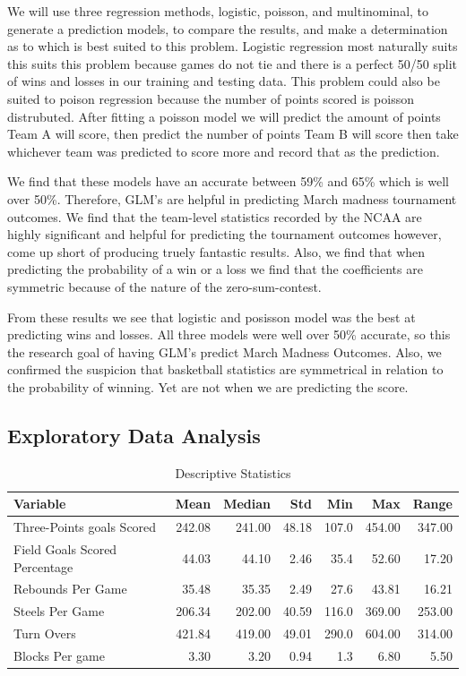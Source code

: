 \documentclass[
  man,floatsintext]{apa6}
\begin{document}
We will use three regression methods, logistic, poisson, and multinominal, to generate a prediction models, to compare the results, and make a determination as to which is best suited to this problem. Logistic regression most naturally suits this suits this problem because games do not tie and there is a perfect 50/50 split of wins and losses in our training and testing data. This problem could also be suited to poison regression because the number of points scored is poisson distrubuted. After fitting a poisson model we will predict the amount of points Team A will score, then predict the number of points Team B will score then take whichever team was predicted to score more and record that as the prediction.

We find that these models have an accurate between 59\% and 65\% which is well over 50\%. Therefore, GLM's are helpful in predicting March madness tournament outcomes. We find that the team-level statistics recorded by the NCAA are highly significant and helpful for predicting the tournament outcomes however, come up short of producing truely fantastic results. Also, we find that when predicting the probability of a win or a loss we find that the coefficients are symmetric because of the nature of the zero-sum-contest.

From these results we see that logistic and posisson model was the best at predicting wins and losses. All three models were well over 50\% accurate, so this the research goal of having GLM's predict March Madness Outcomes. Also, we confirmed the suspicion that basketball statistics are symmetrical in relation to the probability of winning. Yet are not when we are predicting the score.

\hypertarget{exploratory-data-analysis}{%
\subsection{Exploratory Data Analysis}\label{exploratory-data-analysis}}

\begin{longtable}[t]{lrrrrrr}
\caption{\label{tab:unnamed-chunk-1}Descriptive Statistics}\\
\toprule
Variable & Mean & Median & Std & Min & Max & Range\\
\midrule
Three-Points goals Scored & 242.08 & 241.00 & 48.18 & 107.0 & 454.00 & 347.00\\
Field Goals Scored Percentage & 44.03 & 44.10 & 2.46 & 35.4 & 52.60 & 17.20\\
Rebounds Per Game & 35.48 & 35.35 & 2.49 & 27.6 & 43.81 & 16.21\\
Steels Per Game & 206.34 & 202.00 & 40.59 & 116.0 & 369.00 & 253.00\\
Turn Overs & 421.84 & 419.00 & 49.01 & 290.0 & 604.00 & 314.00\\
\addlinespace
Blocks Per game & 3.30 & 3.20 & 0.94 & 1.3 & 6.80 & 5.50\\
\bottomrule
\end{longtable}
\end{document}
